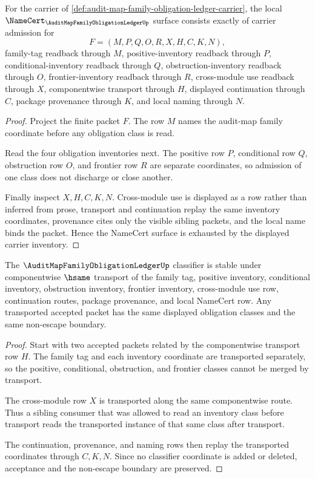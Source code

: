 \begin{theorem}
\label{thm:audit-map-family-ledger-namecert-obligations}
For the carrier of \autoref{def:audit-map-family-obligation-ledger-carrier}, the local $\NameCert_{\AuditMapFamilyObligationLedgerUp}$ surface consists exactly of carrier admission for
$$
F=(M,P,Q,O,R,X,H,C,K,N),
$$
family-tag readback through $M$, positive-inventory readback through $P$, conditional-inventory readback through $Q$, obstruction-inventory readback through $O$, frontier-inventory readback through $R$, cross-module use readback through $X$, componentwise transport through $H$, displayed continuation through $C$, package provenance through $K$, and local naming through $N$.
\end{theorem}
\begin{proof}
Project the finite packet $F$. The row $M$ names the audit-map family coordinate before any obligation class is read.

Read the four obligation inventories next. The positive row $P$, conditional row $Q$, obstruction row $O$, and frontier row $R$ are separate coordinates, so admission of one class does not discharge or close another.

Finally inspect $X,H,C,K,N$. Cross-module use is displayed as a row rather than inferred from prose, transport and continuation replay the same inventory coordinates, provenance cites only the visible sibling packets, and the local name binds the packet. Hence the NameCert surface is exhausted by the displayed carrier inventory.
\end{proof}

\begin{theorem}
\label{thm:audit-map-family-ledger-classifier-stability}
The $\AuditMapFamilyObligationLedgerUp$ classifier is stable under componentwise $\hsame$ transport of the family tag, positive inventory, conditional inventory, obstruction inventory, frontier inventory, cross-module use row, continuation routes, package provenance, and local NameCert row. Any transported accepted packet has the same displayed obligation classes and the same non-escape boundary.
\end{theorem}
\begin{proof}
Start with two accepted packets related by the componentwise transport row $H$. The family tag and each inventory coordinate are transported separately, so the positive, conditional, obstruction, and frontier classes cannot be merged by transport.

The cross-module row $X$ is transported along the same componentwise route. Thus a sibling consumer that was allowed to read an inventory class before transport reads the transported instance of that same class after transport.

The continuation, provenance, and naming rows then replay the transported coordinates through $C,K,N$. Since no classifier coordinate is added or deleted, acceptance and the non-escape boundary are preserved.
\end{proof}

